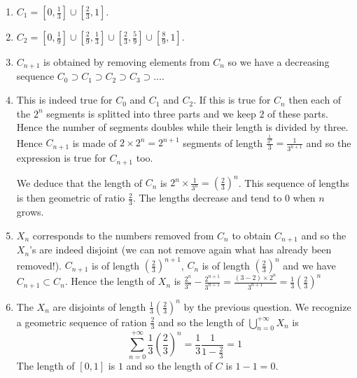 \begin{enumerate}
\item $C_1 = \left[0,\frac{1}{3}\right] \cup \left[\frac{2}{3},1\right]$.
\item $C_2 = \left[0,\frac{1}{9}\right] \cup
  \left[\frac{2}{9},\frac{1}{3}\right]
  \cup \left[\frac{2}{3},\frac{5}{9}\right] \cup \left[\frac{8}{9},1\right]$.
\item $C_{n+1}$ is obtained by removing elements from $C_n$ so we have a
  decreasing sequence $C_0 \supset C_1 \supset C_2 \supset C_3 \supset \ldots$.
\item
  This is indeed true for $C_0$ and $C_1$ and $C_2$. If this is true
  for $C_n$ then each of the $2^n$ segments is splitted into three parts
  and we keep $2$ of these parts. Hence the number of segments doubles
  while their length is divided by three. Hence $C_{n+1}$ is made of
  $2 \times 2^n = 2^{n+1}$ segments of length $\frac{\frac{1}{3^n}}{3} =
  \frac{1}{3^{n+1}}$ and so the expression is true for $C_{n+1}$ too.

  We deduce that the length of $C_n$ is
  $2^n \times \frac{1}{3^n} = \left(\frac{2}{3}\right)^n$.
  This sequence of lengths is then geometric of ratio $\frac{2}{3}$. The
  lengths decrease and tend to $0$ when $n$ grows.
\item $X_n$ corresponds to the numbers removed from $C_n$ to obtain
  $C_{n+1}$ and so the $X_n$'s are indeed disjoint (we can not remove again
  what has already been removed!).
  $C_{n+1}$ is of length $\left(\frac{2}{3}\right)^{n+1}$,
  $C_n$ is of length $\left(\frac{2}{3}\right)^{n}$ and we have
  $C_{n+1} \subset C_n$. Hence the length of $X_n$ is
  $\frac{2^n}{3^n} - \frac{2^{n+1}}{3^{n+1}} =
  \frac{{(3 - 2)} \times 2^n}{3^{n+1}} = \frac{1}{3} \left(\frac{2}{3}\right)^n$
\item The $X_n$ are disjoints of length $\frac{1}{3} \left(\frac{2}{3}\right)^n$
  by the previous question. We recognize a geometric sequence of ration
  $\frac{2}{3}$ and so the length of $\bigcup_{n=0}^{+\infty} X_n$ is
  $$\sum_{n=0}^{+\infty} \frac{1}{3} \left(\frac{2}{3}\right)^n =
  \frac{1}{3}\frac{1}{1-\frac{2}{3}} = 1$$
  The length of $[0,1]$ is $1$ and so the length of $C$ is $1 - 1 = 0$.
\end{enumerate}
